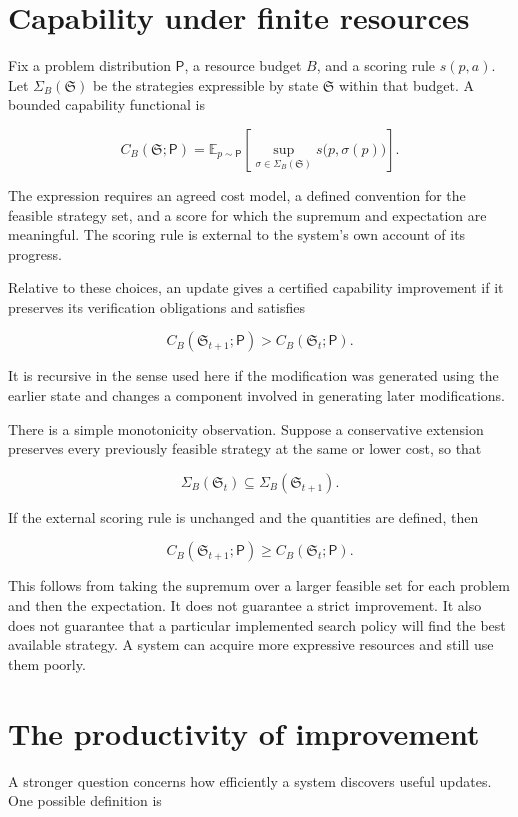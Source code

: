 \documentclass[11pt,oneside,openany]{book}
\begin{document}
\section{Capability under finite resources}
Fix a problem distribution \(\mathsf P\), a resource budget \(B\), and a scoring rule \(s(p,a)\). Let \(\Sigma_B(\mathfrak S)\) be the strategies expressible by state \(\mathfrak S\) within that budget. A bounded capability functional is

\[
C_B(\mathfrak S;\mathsf P)
=\mathbb E_{p\sim\mathsf P}
\left[\sup_{\sigma\in\Sigma_B(\mathfrak S)}s\bigl(p,\sigma(p)\bigr)\right].
\]

The expression requires an agreed cost model, a defined convention for the feasible strategy set, and a score for which the supremum and expectation are meaningful. The scoring rule is external to the system's own account of its progress.

Relative to these choices, an update gives a certified capability improvement if it preserves its verification obligations and satisfies

\[
C_B(\mathfrak S_{t+1};\mathsf P)
>C_B(\mathfrak S_t;\mathsf P).
\]

It is recursive in the sense used here if the modification was generated using the earlier state and changes a component involved in generating later modifications.

There is a simple monotonicity observation. Suppose a conservative extension preserves every previously feasible strategy at the same or lower cost, so that

\[
\Sigma_B(\mathfrak S_t)\subseteq\Sigma_B(\mathfrak S_{t+1}).
\]

If the external scoring rule is unchanged and the quantities are defined, then

\[
C_B(\mathfrak S_{t+1};\mathsf P)
\geq C_B(\mathfrak S_t;\mathsf P).
\]

This follows from taking the supremum over a larger feasible set for each problem and then the expectation. It does not guarantee a strict improvement. It also does not guarantee that a particular implemented search policy will find the best available strategy. A system can acquire more expressive resources and still use them poorly.

\section{The productivity of improvement}
A stronger question concerns how efficiently a system discovers useful updates. One possible definition is
\end{document}
